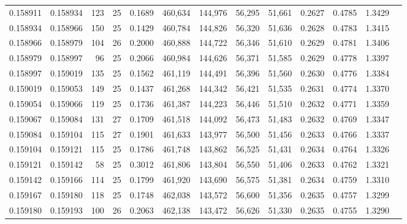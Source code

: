 \begin{tabular}{rrrrrrrrrrrrr}
0.158911 & 0.158934 & 123 &  25 &                                     0.1689 & 460,634 & 144,976 &  56,295 &  51,661 & 0.2627 & 0.4785 & 1.3429 \\
0.158934 & 0.158966 & 150 &  25 &                                     0.1429 & 460,784 & 144,826 &  56,320 &  51,636 & 0.2628 & 0.4783 & 1.3415 \\
0.158966 & 0.158979 & 104 &  26 &                                     0.2000 & 460,888 & 144,722 &  56,346 &  51,610 & 0.2629 & 0.4781 & 1.3406 \\
0.158979 & 0.158997 &  96 &  25 &                                     0.2066 & 460,984 & 144,626 &  56,371 &  51,585 & 0.2629 & 0.4778 & 1.3397 \\
0.158997 & 0.159019 & 135 &  25 &                                     0.1562 & 461,119 & 144,491 &  56,396 &  51,560 & 0.2630 & 0.4776 & 1.3384 \\
0.159019 & 0.159053 & 149 &  25 &                                     0.1437 & 461,268 & 144,342 &  56,421 &  51,535 & 0.2631 & 0.4774 & 1.3370 \\
0.159054 & 0.159066 & 119 &  25 &                                     0.1736 & 461,387 & 144,223 &  56,446 &  51,510 & 0.2632 & 0.4771 & 1.3359 \\
0.159067 & 0.159084 & 131 &  27 &                                     0.1709 & 461,518 & 144,092 &  56,473 &  51,483 & 0.2632 & 0.4769 & 1.3347 \\
0.159084 & 0.159104 & 115 &  27 &                                     0.1901 & 461,633 & 143,977 &  56,500 &  51,456 & 0.2633 & 0.4766 & 1.3337 \\
0.159104 & 0.159121 & 115 &  25 &                                     0.1786 & 461,748 & 143,862 &  56,525 &  51,431 & 0.2634 & 0.4764 & 1.3326 \\
0.159121 & 0.159142 &  58 &  25 &                                     0.3012 & 461,806 & 143,804 &  56,550 &  51,406 & 0.2633 & 0.4762 & 1.3321 \\
0.159142 & 0.159166 & 114 &  25 &                                     0.1799 & 461,920 & 143,690 &  56,575 &  51,381 & 0.2634 & 0.4759 & 1.3310 \\
0.159167 & 0.159180 & 118 &  25 &                                     0.1748 & 462,038 & 143,572 &  56,600 &  51,356 & 0.2635 & 0.4757 & 1.3299 \\
0.159180 & 0.159193 & 100 &  26 &                                     0.2063 & 462,138 & 143,472 &  56,626 &  51,330 & 0.2635 & 0.4755 & 1.3290 \\

\end{tabular}
